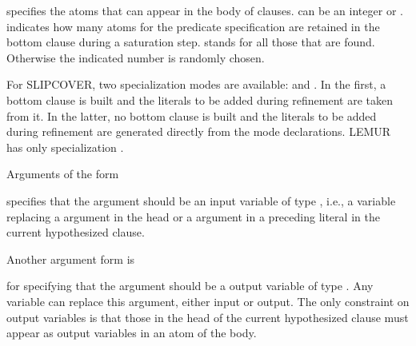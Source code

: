 \documentclass[letterpaper,10pt,english]{sphinxmanual}
\begin{document}
\sphinxAtStartPar
specifies the atoms that can appear in the body of clauses.  can be an integer or \sphinxcode{\sphinxupquote{*}}.  indicates how many atoms for the predicate specification are retained in the bottom clause during a saturation step. \sphinxcode{\sphinxupquote{*}} stands for all those that are found.
Otherwise the indicated number is randomly chosen.

\sphinxAtStartPar
For SLIPCOVER, two specialization modes are available:  and . In the first, a bottom clause is built and the literals to be added during refinement are taken from it. In the latter, no bottom clause is built and the literals to be added during refinement are generated directly from the mode declarations. LEMUR has only specialization .

\sphinxAtStartPar
Arguments of the form

\begin{sphinxVerbatim}[commandchars=\\\{\}]
\end{sphinxVerbatim}

\sphinxAtStartPar
specifies that the argument should be an input variable of type , i.e., a variable replacing a  argument in the head or a  argument in a preceding literal in the current hypothesized clause.

\sphinxAtStartPar
Another argument form is

\begin{sphinxVerbatim}[commandchars=\\\{\}]
\end{sphinxVerbatim}

\sphinxAtStartPar
for specifying that the argument should be a output variable of type .
Any variable can replace this argument, either input or output.
The only constraint on output variables is that those in the head of the current hypothesized clause must appear as output variables in an atom of the body.
\end{document}
